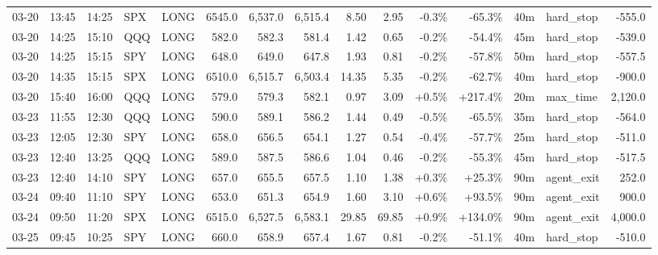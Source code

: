 \documentclass[11pt,a4paper,twoside]{article}
\begin{document}
\begin{landscape}
\begin{center}
\begin{longtable}{>{\color{txtmain}}l l l l l r r r r r r r r >{\color{txtmain}}l r}
03-20 & 13:45 & 14:25 & SPX & LONG & 6545.0 & 6,537.0 & 6,515.4 & 8.50 & 2.95 & \textcolor{lossred}{-0.3\%} & \textcolor{lossred}{-65.3\%} & 40m & hard\_stop & \textcolor{lossred}{-555.0} \\
03-20 & 14:25 & 15:10 & QQQ & LONG & 582.0 & 582.3 & 581.4 & 1.42 & 0.65 & \textcolor{lossred}{-0.2\%} & \textcolor{lossred}{-54.4\%} & 45m & hard\_stop & \textcolor{lossred}{-539.0} \\
03-20 & 14:25 & 15:15 & SPY & LONG & 648.0 & 649.0 & 647.8 & 1.93 & 0.81 & \textcolor{lossred}{-0.2\%} & \textcolor{lossred}{-57.8\%} & 50m & hard\_stop & \textcolor{lossred}{-557.5} \\
03-20 & 14:35 & 15:15 & SPX & LONG & 6510.0 & 6,515.7 & 6,503.4 & 14.35 & 5.35 & \textcolor{lossred}{-0.2\%} & \textcolor{lossred}{-62.7\%} & 40m & hard\_stop & \textcolor{lossred}{-900.0} \\
03-20 & 15:40 & 16:00 & QQQ & LONG & 579.0 & 579.3 & 582.1 & 0.97 & 3.09 & \textcolor{wingreen}{+0.5\%} & \textcolor{wingreen}{+217.4\%} & 20m & max\_time & \textcolor{wingreen}{2,120.0} \\
03-23 & 11:55 & 12:30 & QQQ & LONG & 590.0 & 589.1 & 586.2 & 1.44 & 0.49 & \textcolor{lossred}{-0.5\%} & \textcolor{lossred}{-65.5\%} & 35m & hard\_stop & \textcolor{lossred}{-564.0} \\
03-23 & 12:05 & 12:30 & SPY & LONG & 658.0 & 656.5 & 654.1 & 1.27 & 0.54 & \textcolor{lossred}{-0.4\%} & \textcolor{lossred}{-57.7\%} & 25m & hard\_stop & \textcolor{lossred}{-511.0} \\
03-23 & 12:40 & 13:25 & QQQ & LONG & 589.0 & 587.5 & 586.6 & 1.04 & 0.46 & \textcolor{lossred}{-0.2\%} & \textcolor{lossred}{-55.3\%} & 45m & hard\_stop & \textcolor{lossred}{-517.5} \\
03-23 & 12:40 & 14:10 & SPY & LONG & 657.0 & 655.5 & 657.5 & 1.10 & 1.38 & \textcolor{wingreen}{+0.3\%} & \textcolor{wingreen}{+25.3\%} & 90m & agent\_exit & \textcolor{wingreen}{252.0} \\
03-24 & 09:40 & 11:10 & SPY & LONG & 653.0 & 651.3 & 654.9 & 1.60 & 3.10 & \textcolor{wingreen}{+0.6\%} & \textcolor{wingreen}{+93.5\%} & 90m & agent\_exit & \textcolor{wingreen}{900.0} \\
03-24 & 09:50 & 11:20 & SPX & LONG & 6515.0 & 6,527.5 & 6,583.1 & 29.85 & 69.85 & \textcolor{wingreen}{+0.9\%} & \textcolor{wingreen}{+134.0\%} & 90m & agent\_exit & \textcolor{wingreen}{4,000.0} \\
03-25 & 09:45 & 10:25 & SPY & LONG & 660.0 & 658.9 & 657.4 & 1.67 & 0.81 & \textcolor{lossred}{-0.2\%} & \textcolor{lossred}{-51.1\%} & 40m & hard\_stop & \textcolor{lossred}{-510.0} \\

\end{longtable}
\end{center}
\end{landscape}
\end{document}
